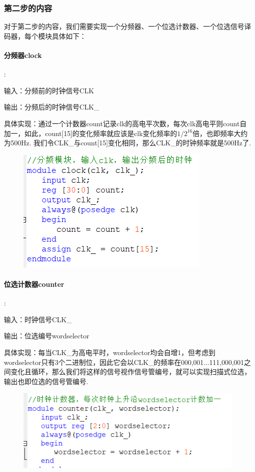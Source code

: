 \documentclass[UTF8]{ctexart}
\begin{document}
\subsubsection{第二步的内容}

对于第二步的内容，我们需要实现一个分频器、一个位选计数器、一个位选信号译码器，每个模块具体如下：\\
\paragraph{分频器clock}:\par
输入：分频前的时钟信号CLK\par
输出：分频后的时钟信号CLK\_\par
具体实现：通过一个计数器count记录clk的高电平次数，每次clk高电平则count自加一，如此，count[15]的变化频率就应该是clk变化频率的$1/2^{16}$倍，也即频率大约为500Hz. 我们令CLK\_与count[15]变化相同，那么CLK\_的时钟频率就是500Hz了.
\begin{figure}[H]\begin{center}
    \includegraphics[scale=1]{clock.PNG}
\end{center}\end{figure}
\paragraph{位选计数器counter}:\par
输入：时钟信号CLK\_\par
输出：位选编号wordselector\par
具体实现：每当CLK\_为高电平时，wordselector均会自增1，但考虑到wordselector只有3个二进制位，因此它会以CLK\_的频率在000,001...111,000,001之间变化且循环，那么我们将这样的信号视作信号管编号，就可以实现扫描式位选，输出也即位选的信号管编号.
\begin{figure}[H]\begin{center}
    \includegraphics[scale=1]{counter.PNG}
\end{center}\end{figure}
\end{document}
